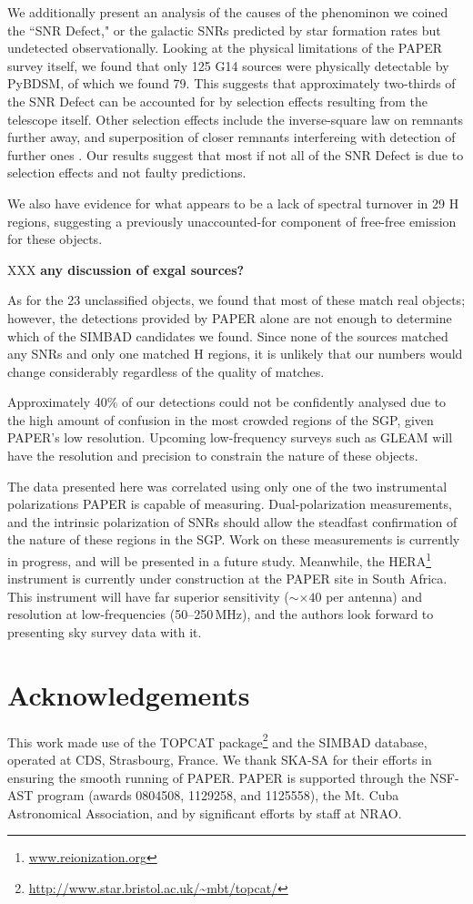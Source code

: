 \documentclass[useAMS,usenatbib]{mn2e}
\begin{document}
We additionally  present an analysis of the causes of the phenominon we coined the ``SNR Defect," or the galactic SNRs predicted by star formation rates but undetected observationally.  Looking at the physical limitations of the PAPER survey itself, we found that only 125 G14 sources were physically detectable by PyBDSM, of which we found 79.  This suggests that approximately two-thirds of the SNR Defect can be accounted for by selection effects resulting from the telescope itself.  Other selection effects include the inverse-square law on remnants further away, and superposition of closer remnants interfereing with detection of further ones \citep{Brogan.06}.  Our results suggest that most if not all of the SNR Defect is due to selection effects and not faulty predictions.  

We also have evidence for what appears to be a lack of spectral turnover in 29 {H} regions, suggesting a previously unaccounted-for component of free-free emission for these objects.

XXX {\bf any discussion of exgal sources?}

As for the 23 unclassified objects, we found that most of these match real objects; however, the detections provided by PAPER alone are not enough to determine which of the SIMBAD candidates we found.  Since none of the sources matched any SNRs and only one matched {H} regions, it is unlikely that our numbers would change considerably regardless of the quality of matches.  

Approximately 40\% of our detections could not be confidently analysed due to the high amount of confusion in the most crowded regions of the SGP, given PAPER's low resolution. Upcoming low-frequency surveys such as GLEAM will have the resolution and precision to constrain the nature of these objects.

The data presented here was correlated using only one of the two instrumental polarizations PAPER is capable of measuring. Dual-polarization measurements, and the intrinsic polarization of SNRs \citep[e.g.][]{Gao_v.11} should allow the steadfast confirmation of the nature of these regions in the SGP. Work on these measurements is currently in progress, and will be presented in a future study. Meanwhile, the HERA\footnote{\url{www.reionization.org}} instrument is currently under construction at the PAPER site in South Africa. This instrument will have far superior sensitivity ($\sim\times40$ per antenna) and resolution at low-frequencies (50--250\,MHz), and the authors look forward to presenting sky survey data with it.

\section*{Acknowledgements}
This work made use of the TOPCAT package\footnote{\url{http://www.star.bristol.ac.uk/~mbt/topcat/}} and the SIMBAD database, operated at CDS, Strasbourg, France.
We thank SKA-SA for their efforts in ensuring the smooth running of PAPER. PAPER is supported through the NSF-AST program (awards 0804508, 1129258, and 1125558), the Mt. Cuba Astronomical Association, and by significant efforts by staff at NRAO. 


{}
\end{document}
